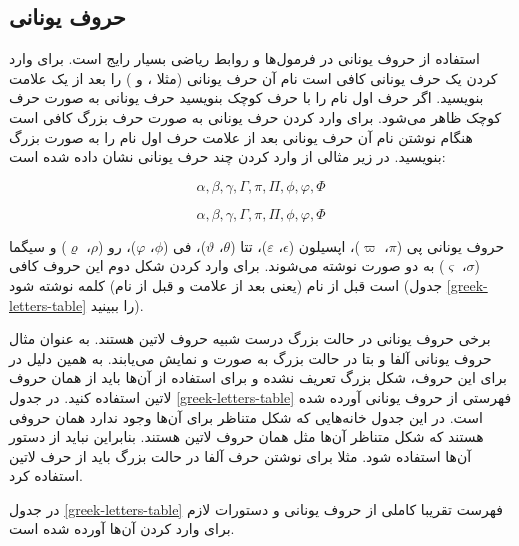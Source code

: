 \subsection{حروف یونانی}
استفاده از حروف یونانی در فرمول‌ها و روابط ریاضی بسیار رایج است. برای وارد کردن
یک حرف یونانی کافی است نام آن حرف یونانی (مثلا ،  و
) را بعد از یک علامت \lr{\textbackslash} بنویسید. اگر حرف اول نام را
با حرف کوچک  بنویسید حرف یونانی به صورت حرف کوچک ظاهر
می‌شود. برای وارد کردن حرف یونانی به صورت حرف بزرگ کافی
است هنگام نوشتن نام آن حرف یونانی بعد از علامت \lr{\textbackslash} حرف اول نام
را به صورت بزرگ بنویسید. در زیر مثالی از وارد کردن چند حرف یونانی نشان داده شده است:

\begin{latex}
\[
\alpha, \beta, \gamma, \Gamma, \pi, \Pi, \phi, \varphi, \Phi
\]
\end{latex}
\[
\alpha, \beta, \gamma, \Gamma, \pi, \Pi, \phi, \varphi, \Phi
\]

\begin{note}
حروف یونانی پی ($\pi$، $\varpi$)، اپسیلون ($\epsilon$، $\varepsilon$)، تتا
($\theta$، $\vartheta$)، فی ($\phi$، $\varphi$)، رو ($\rho$، $\varrho$) و سیگما
($\sigma$، $\varsigma$) به دو صورت نوشته می‌شوند. برای وارد کردن شکل دوم این
حروف کافی است قبل از نام (یعنی بعد از علامت \lr{\textbackslash} و قبل از نام)
کلمه  نوشته شود (جدول \ref{greek-letters-table} را ببینید).
\end{note}

\begin{note}
برخی حروف یونانی در حالت بزرگ درست شبیه حروف لاتین هستند. به عنوان مثال حروف
یونانی آلفا و بتا در حالت بزرگ به صورت  و  نمایش می‌یابند.
به همین دلیل در \lr{\LaTeX} برای این حروف، شکل بزرگ تعریف نشده و برای استفاده از
آن‌ها باید از همان حروف لاتین استفاده کنید. در جدول \ref{greek-letters-table}
فهرستی از حروف یونانی آورده شده است. در این جدول خانه‌هایی که شکل متناظر برای
آن‌ها وجود ندارد همان حروفی هستند که شکل متناظر آن‌ها مثل همان حروف لاتین هستند.
بنابراین نباید از دستور آن‌ها استفاده شود. مثلا برای نوشتن حرف آلفا در حالت بزرگ
باید از حرف لاتین  استفاده کرد.
\end{note}


در جدول \ref{greek-letters-table} فهرست تقریبا کاملی از حروف یونانی و دستورات لازم برای وارد کردن
آن‌ها آورده شده است.

